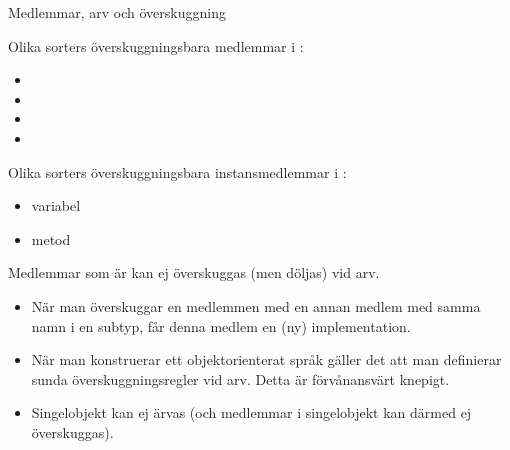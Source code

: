 



\begin{Slide}{Medlemmar, arv och överskuggning}\SlideFontTiny
\begin{multicols}{2}
\noindent Olika sorters överskuggningsbara medlemmar i :
\begin{itemize}
\item {}
\item {}
\item {}
\item {}
\end{itemize}

\columnbreak

\pause

\noindent Olika sorters överskuggningsbara instansmedlemmar i :
\begin{itemize}
\item variabel
\item metod
\end{itemize}

{\SlideFontTiny\noindent Medlemmar som är  kan ej överskuggas (men döljas) vid arv.}

\vspace{0.5em}
\end{multicols}

\pause
\begin{itemize}\SlideFontTiny
\item När man överskuggar  en medlemmen med en annan medlem med samma namn i en subtyp, får denna medlem en (ny) implementation.

\item När man konstruerar ett objektorienterat språk gäller det att man definierar sunda överskuggningsregler vid arv. Detta är förvånansvärt knepigt.

\item Singelobjekt kan ej ärvas (och medlemmar i singelobjekt kan därmed ej överskuggas).
\end{itemize}
\end{Slide}



